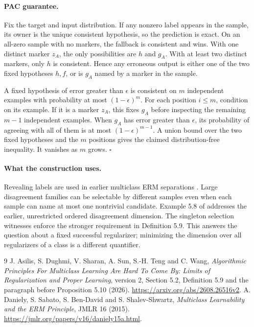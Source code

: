 \documentclass[11pt]{article}
\begin{document}
\paragraph{PAC guarantee.} Fix the target and input distribution. If any nonzero label appears in the sample, its owner is the unique consistent hypothesis, so the prediction is exact. On an all-zero sample with no markers, the fallback is consistent and wins. With one distinct marker $z_A$, the only possibilities are $h$ and $g_A$. With at least two distinct markers, only $h$ is consistent. Hence any erroneous output is either one of the two fixed hypotheses $h,f$, or is $g_A$ named by a marker in the sample.

A fixed hypothesis of error greater than $\epsilon$ is consistent on $m$ independent examples with probability at most $(1-\epsilon)^m$. For each position $i\le m$, condition on its example. If it is a marker $z_A$, this fixes $g_A$ before inspecting the remaining $m-1$ independent examples. When $g_A$ has error greater than $\epsilon$, its probability of agreeing with all of them is at most $(1-\epsilon)^{m-1}$. A union bound over the two fixed hypotheses and the $m$ positions gives the claimed distribution-free inequality. It vanishes as $m$ grows. \hfill$\square$

\paragraph{What the construction uses.} Revealing labels are used in earlier multiclass ERM separations \cite{dan}. Large disagreement families can be selectable by different samples even when each sample can name at most one nontrivial candidate. Example 5.8 of \cite{ad} addresses the earlier, unrestricted ordered disagreement dimension. The singleton selection witnesses enforce the stronger requirement in Definition 5.9. This answers the question about a fixed successful regularizer; minimizing the dimension over all regularizers of a class is a different quantifier.
\begin{thebibliography}{9}
 J. Asilis, S. Dughmi, V. Sharan, A. Sun, S.-H. Teng and C. Wang, \emph{Algorithmic Principles For Multiclass Learning Are Hard To Come By: Limits of Regularization and Proper Learning}, version 2, Section 5.2, Definition 5.9 and the paragraph before Proposition 5.10 (2026). \url{https://arxiv.org/abs/2608.26516v2}.
 A. Daniely, S. Sabato, S. Ben-David and S. Shalev-Shwartz, \emph{Multiclass Learnability and the ERM Principle}, JMLR 16 (2015). \url{https://jmlr.org/papers/v16/daniely15a.html}.
\end{thebibliography}
\end{document}
